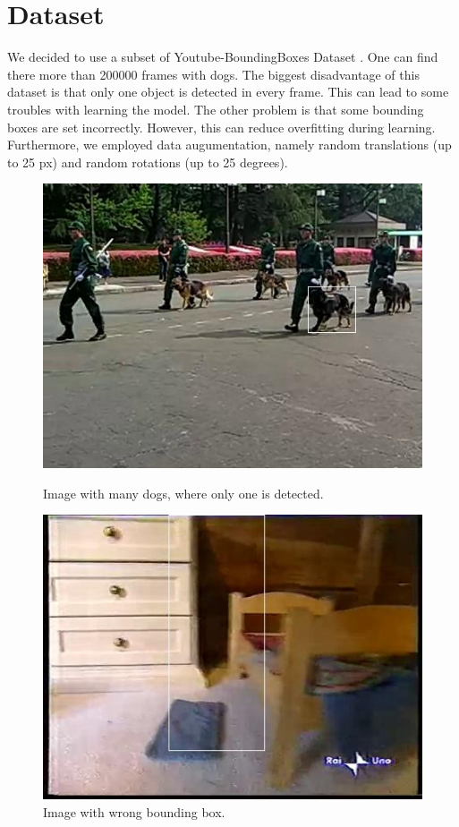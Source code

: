 \documentclass{article}
\begin{document}
\section*{Dataset}
We decided to use a subset of Youtube-BoundingBoxes Dataset \cite{youtube-bb}. One can find there more than 200000 frames with dogs. The biggest disadvantage of this dataset is that only one object is detected in every frame. This can lead to some troubles with learning the model. The other problem is that some bounding boxes are set incorrectly. However, this can reduce overfitting during learning.
Furthermore, we employed data augumentation, namely random translations (up to 25 px) and random rotations (up to 25 degrees).

\begin{figure}[H]

\begin{minipage}{.4\textwidth}
	\includegraphics[width=\textwidth]{multiple_dogs.jpg}
	\caption{Image with many dogs, where only one is detected.}
\end{minipage}%
\hfill
\begin{minipage}{.4\textwidth}
	\includegraphics[width=\textwidth]{wrong_bb.jpg}
	\caption{Image with wrong bounding box.}
\end{minipage}%
\hfill

\end{figure}
\end{document}
